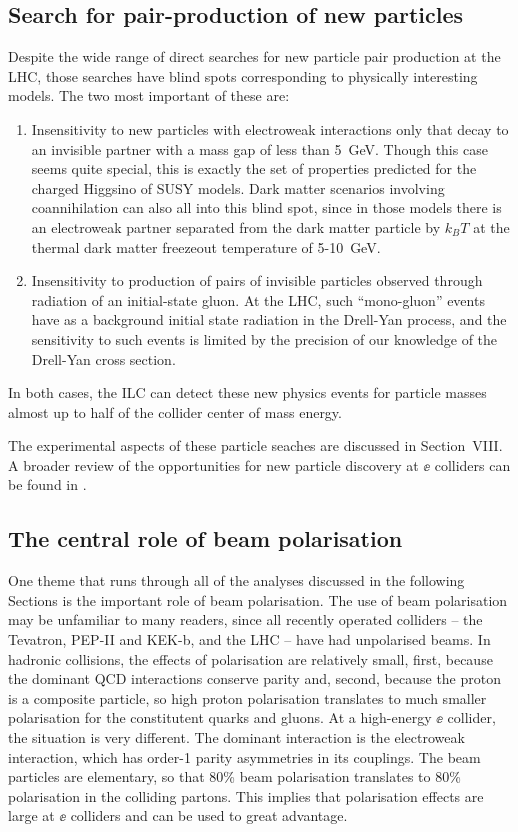      
\subsection{Search for pair-production of new particles}

Despite the wide range of direct searches for new particle pair production at the LHC, 
those searches have blind spots corresponding to physically interesting models.  The two most important of these are:
\begin{enumerate}
\item  Insensitivity to new particles with electroweak interactions only that decay to an invisible partner with a mass gap of less than 5~GeV.   Though this case seems quite special, this is exactly the set of properties predicted for the charged Higgsino of SUSY models.  Dark matter scenarios involving coannihilation can also all into this blind spot, since in those models there is an electroweak partner separated from the dark matter particle by $k_B T$ at the thermal dark matter freezeout temperature of 5-10~GeV.
\item Insensitivity to production of pairs of invisible particles observed through radiation of an initial-state gluon.   At the LHC, such ``mono-gluon'' events have as a background initial state radiation in the Drell-Yan process, and the sensitivity to such events is limited by the precision of our knowledge of the Drell-Yan cross section.
\end{enumerate}
In both cases, the ILC can detect these new physics events for particle masses almost up to half of  the collider center of mass energy.

The experimental aspects of these particle seaches are discussed in Section~VIII.  A broader review of the opportunities for new particle discovery at $\ee$ colliders can be found in \cite{Fujii:2017ekh}.

\subsection{The central role of beam polarisation}
\label{subsec:beampol}

One theme that runs through all of the analyses discussed in the following Sections is the  important role of beam polarisation.   The use of beam polarisation may be unfamiliar to many readers, since all recently operated colliders -- the Tevatron, PEP-II and KEK-b, and the LHC -- have had unpolarised beams.   In hadronic 
collisions, the effects of polarisation are relatively small, first, because the dominant QCD interactions conserve parity and, second, because the proton is a composite particle, so high proton polarisation translates to much smaller polarisation for the constitutent quarks and gluons.   At a high-energy $\ee$ collider, the situation is very different.  The dominant interaction is the electroweak interaction, which has 
order-1 parity asymmetries in its couplings.  The beam particles are elementary, so that 80\% beam polarisation translates to 80\% polarisation in the colliding partons.
This implies  that polarisation effects are large at $\ee$  colliders and can be used to great advantage.   

